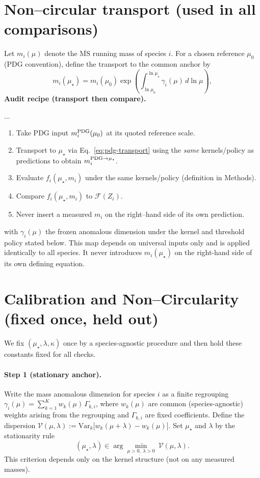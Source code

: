 \documentclass[epjc3]{svjour3}
\begin{document}
\section{Non–circular transport (used in all comparisons)}
Let $m_i(\mu)$ denote the $\overline{\mathrm{MS}}$ running mass of species $i$. For a chosen reference $\mu_0$ (PDG convention), define the transport to the common anchor by
\[
m_i(\mu_\star)=m_i(\mu_0)\exp\!\left(\int_{\ln\mu_0}^{\ln\mu_\star}\gamma_i(\mu)\,d\ln\mu\right),
\label{eq:pdg-transport}
\]
\noindent\textbf{Audit recipe (transport then compare).}
\usepackage{enumitem}
...
\begin{enumerate}[label={(\roman*)}]
  \item Take PDG input $m_i^{\rm PDG}(\mu_0)$ at its quoted reference scale.
  \item Transport to $\mu_\star$ via Eq.~\eqref{eq:pdg-transport} using the \emph{same} kernels/policy as predictions to obtain $m_i^{\rm PDG\to\mu_\star}$.
  \item Evaluate $f_i(\mu_\star,m_i)$ under the same kernels/policy (definition in Methods).
  \item Compare $f_i(\mu_\star,m_i)$ to $\mathcal F(Z_i)$.
  \item Never insert a measured $m_i$ on the right–hand side of its own prediction.
\end{enumerate}
with $\gamma_i(\mu)$ the frozen anomalous dimension under the kernel and threshold policy stated below. This map depends on universal inputs only and is applied identically to all species. It never introduces $m_i(\mu_\star)$ on the right-hand side of its own defining equation.

\section{Calibration and Non–Circularity (fixed once, held out)}
We fix $(\mu_\star,\lambda,\kappa)$ once by a species-agnostic procedure and then hold these constants fixed for all checks.

\paragraph{Step 1 (stationary anchor).}
Write the mass anomalous dimension for species $i$ as a finite regrouping
$\gamma_i(\mu)=\sum_{k=1}^K w_k(\mu)\,\Gamma_{k,i}$,
where $w_k(\mu)$ are common (species-agnostic) weights arising from the regrouping and $\Gamma_{k,i}$ are fixed coefficients.
Define the dispersion $\mathcal{V}(\mu,\lambda):=\mathrm{Var}_k\!\big[w_k(\mu+\lambda)-w_k(\mu)\big]$.
Set $\mu_\star$ and $\lambda$ by the stationarity rule
\[
(\mu_\star,\lambda)\in\arg\min_{\mu>0,\ \lambda>0}\ \mathcal{V}(\mu,\lambda).
\]
This criterion depends only on the kernel structure (not on any measured masses).
\end{document}
